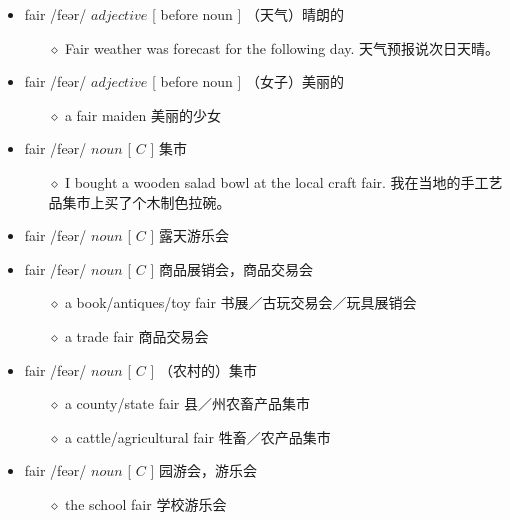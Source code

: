 \documentclass[a4paper,top=2.5cm,buttom=2.5cm10.5pt]{book}
\begin{document}
\begin{itemize}
\item fair /feər/ $ adjective $ [ before noun ] （天气）晴朗的
\begin{itemize}
\item[$\diamond$] Fair weather was forecast for the following day.
天气预报说次日天晴。
\end{itemize}
\end{itemize}
\begin{itemize}
\item fair /feər/ $ adjective $ [ before noun ] （女子）美丽的
\begin{itemize}
\item[$\diamond$] a fair maiden
美丽的少女
\end{itemize}
\end{itemize}
\begin{itemize}
\item fair /feər/ $ noun $ [  $ C $  ] 集市
\begin{itemize}
\item[$\diamond$] I bought a wooden salad bowl at the local craft fair.
我在当地的手工艺品集市上买了个木制色拉碗。
\end{itemize}
\end{itemize}
\begin{itemize}
\item fair /feər/ $ noun $ [  $ C $  ] 露天游乐会
\end{itemize}
\begin{itemize}
\item fair /feər/ $ noun $ [  $ C $  ] 商品展销会，商品交易会
\begin{itemize}
\item[$\diamond$] a book/antiques/toy fair
书展／古玩交易会／玩具展销会
\item[$\diamond$] a trade fair
商品交易会
\end{itemize}
\end{itemize}
\begin{itemize}
\item fair /feər/ $ noun $ [  $ C $  ] （农村的）集市
\begin{itemize}
\item[$\diamond$] a county/state fair
县／州农畜产品集市
\item[$\diamond$] a cattle/agricultural fair
牲畜／农产品集市
\end{itemize}
\end{itemize}
\begin{itemize}
\item fair /feər/ $ noun $ [  $ C $  ] 园游会，游乐会
\begin{itemize}
\item[$\diamond$] the school fair
学校游乐会
\end{itemize}
\end{itemize}
\end{document}
